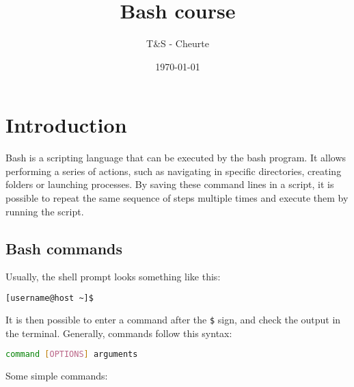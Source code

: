 \documentclass{article}
\author{{T\&S - Cheurte}}
\date{\today}
\title{Bash course}
\newcommand{\inlinecode}[1]{\colorbox{backcolour}{\footnotesize{\texttt{#1}}}}
\begin{document}
\maketitle

\tableofcontents

\pagebreak

\section{Introduction}
Bash is a scripting language that can be executed by the bash program. It allows performing a series of actions, such as navigating in specific directories, creating folders or launching processes. By saving these command lines in a script, it is possible to repeat the same sequence of steps multiple times and execute them by running the script.

\subsection{Bash commands}
Usually, the shell prompt looks something like this:
\begin{lstlisting}[style=terminal, language=bash]
[username@host ~]$
\end{lstlisting}
It is then possible to enter a command after the \inlinecode{\$} sign, and check the output in the terminal. Generally, commands follow this syntax:

\begin{lstlisting}[style=command, language=bash]
command [OPTIONS] arguments
\end{lstlisting}

Some simple commands:
\end{document}
